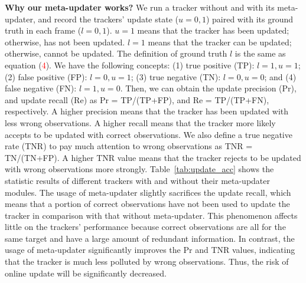 \documentclass[10pt,twocolumn,letterpaper]{article}
\begin{document}
\noindent \textbf{Why our meta-updater works?}
We run a tracker without and with its meta-updater, and record the trackers' update state
($u = 0, 1$) paired with its ground truth in each frame ($l = 0, 1$).
$u = 1$ means that the tracker has been updated; otherwise, has not been updated.
$l=1$ means that the tracker can be updated; otherwise, cannot be updated.
The definition of ground truth $l$ is the same as equation (\textcolor{red}{4}).
We have the following concepts: (1) true positive (TP): $l = 1, u = 1$;
(2) false positive (FP): $l = 0, u = 1$; (3) true negative (TN): $l = 0, u = 0$; and
(4) false negative (FN): $l = 1, u = 0$.
Then, we can obtain the update precision (Pr), and update recall (Re) as Pr = TP/(TP+FP),
and Re = TP/(TP+FN), respectively.
A higher precision means that the tracker has been updated with less wrong observations.
A higher recall means that the tracker more likely accepts to be updated with correct observations.
We also define a  true negative rate (TNR) to pay much attention to wrong observations
as TNR = TN/(TN+FP).
A higher TNR value means that the tracker rejects to be updated with wrong observations
more strongly.
Table~\ref{tab:update_acc} shows the statistic results of different trackers with and without
their meta-updater modules.
The usage of meta-updater slightly sacrifices the update recall, which means that a portion of
correct observations have not been used to update the tracker in comparison with that without
meta-updater.
This phenomenon affects little on the trackers' performance because correct observations are all for
the same target and have a large amount of redundant information.
In contrast, the usage of meta-updater significantly improves the Pr and TNR values, indicating that
the tracker is much less polluted by wrong observations.
Thus, the risk of online update will be significantly decreased.
\end{document}
